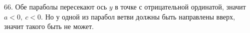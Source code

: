 66.  Обе параболы пересекают ось $y$ в точке с отрицательной ординатой, значит $a<0,\ c<0.$ Но у одной из парабол ветви должны быть направлены вверх, значит такого быть не может.\\
